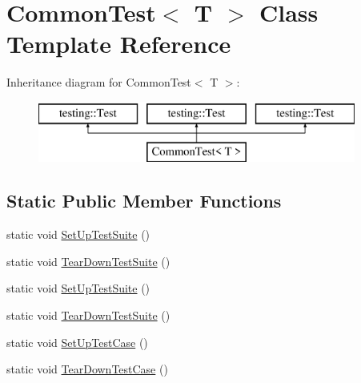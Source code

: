 \hypertarget{class_common_test}{}\section{Common\+Test$<$ T $>$ Class Template Reference}
\label{class_common_test}
Inheritance diagram for Common\+Test$<$ T $>$\+:\begin{figure}[H]
\begin{center}
\leavevmode
\includegraphics[height=2.000000cm]{d5/d19/class_common_test}
\end{center}
\end{figure}
\subsection*{Static Public Member Functions}
\begin{DoxyCompactItemize}
\item 
static void \mbox{\hyperlink{class_common_test_a34d4de46bf01a38d305277a9b83c67a1}{Set\+Up\+Test\+Suite}} ()
\item 
static void \mbox{\hyperlink{class_common_test_a1ed5842244ccca6c3bee6eb9e3b8bc9b}{Tear\+Down\+Test\+Suite}} ()
\item 
static void \mbox{\hyperlink{class_common_test_a34d4de46bf01a38d305277a9b83c67a1}{Set\+Up\+Test\+Suite}} ()
\item 
static void \mbox{\hyperlink{class_common_test_a1ed5842244ccca6c3bee6eb9e3b8bc9b}{Tear\+Down\+Test\+Suite}} ()
\item 
static void \mbox{\hyperlink{class_common_test_a6edd90f32f45cc49e4a423b22bd770ce}{Set\+Up\+Test\+Case}} ()
\item 
static void \mbox{\hyperlink{class_common_test_a68d2bf5108cf28478331588fbdff4838}{Tear\+Down\+Test\+Case}} ()
\end{DoxyCompactItemize}
